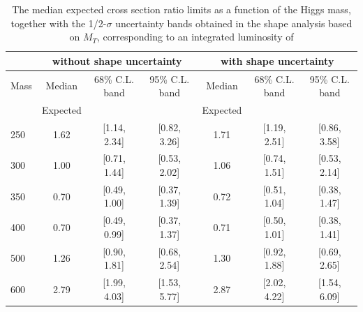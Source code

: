 \begin{table}
\begin{center}
{\normalsize
\begin{tabular}{|l|c|c|c|c|c|c|}
\hline
      &  \multicolumn{3}{c|}{ without shape uncertainty} &\multicolumn{3}{c|}{ with shape uncertainty} \\
\hline
Mass  &  Median      &     68\% C.L. band &  95\% C.L. band &  Median	   &	 68\% C.L. band &  95\% C.L. band\\
      &  Expected    &                    &                 &  Expected    &			&		 \\
\hline
250 & 1.62 & [1.14, 2.34] & [0.82, 3.26] & 1.71 & [1.19, 2.51] & [0.86, 3.58] \\
300 & 1.00 & [0.71, 1.44] & [0.53, 2.02] & 1.06 & [0.74, 1.51] & [0.53, 2.14] \\
350 & 0.70 & [0.49, 1.00] & [0.37, 1.39] & 0.72 & [0.51, 1.04] & [0.38, 1.47] \\
400 & 0.70 & [0.49, 0.99] & [0.37, 1.37] & 0.71 & [0.50, 1.01] & [0.38, 1.41] \\
500 & 1.26 & [0.90, 1.81] & [0.68, 2.54] & 1.30 & [0.92, 1.88] & [0.69, 2.65] \\
600 & 2.79 & [1.99, 4.03] & [1.53, 5.77] & 2.87 & [2.02, 4.22] & [1.54, 6.09] \\
\hline
\end{tabular}
}
\end{center}
\caption{The median expected cross section ratio limits as a function 
of the Higgs mass, together with the 1/2-$\sigma$ uncertainty bands obtained in the shape analysis based on $M_T$, 
corresponding to an integrated luminosity of \intlumi}
\label{tab:limits_mtshape_4fb}
\end{table}

